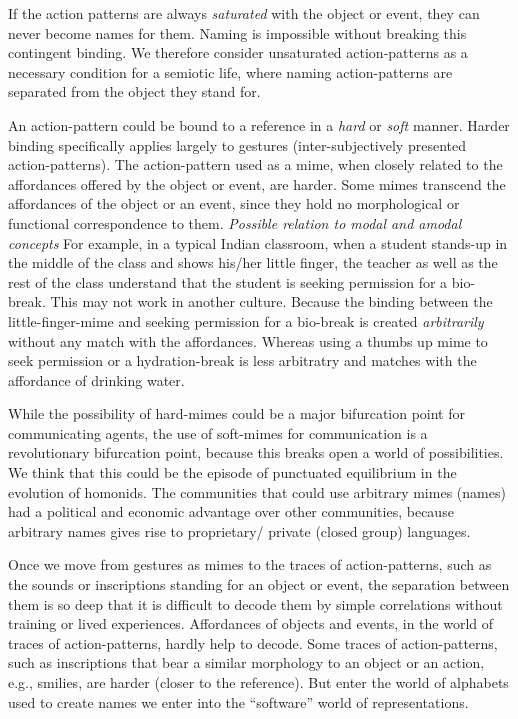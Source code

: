 {{{{{If the action patterns are always \textit{saturated} with the object or event, they can never become names for them. Naming is impossible without breaking this contingent binding. We therefore consider unsaturated action-patterns as a necessary condition for a semiotic life, where naming action-patterns are separated from the object they stand for. 

An action-pattern could be bound to a reference in a \textit{hard} or \textit{soft} manner. Harder binding specifically applies largely to gestures (inter-subjectively presented action-patterns). 
The action-pattern used as a mime, when closely related to the affordances offered by the object or event, are harder. 
Some mimes transcend the affordances of the object or an event, since they hold no morphological or functional correspondence to them. \emph{Possible relation to modal and amodal concepts} For example, in a typical Indian classroom, when a student stands-up in the middle of the class and shows his/her little finger, the teacher as well as the rest of the class understand that the student is seeking permission for a bio-break. This may not work in another culture. Because the binding between the little-finger-mime and seeking permission for a bio-break is created \textit{arbitrarily} without any match with the affordances. Whereas using a thumbs up mime to seek permission or a hydration-break is less arbitratry and matches with the affordance of drinking water. 

While the possibility of hard-mimes could be a major bifurcation point for communicating agents, the use of soft-mimes for communication is a revolutionary bifurcation point, because this breaks open a world of possibilities. 
We think that this could be the episode of punctuated equilibrium\cite{gould1977punctuated} in the evolution of homonids. The communities that could use arbitrary mimes (names) had a political and economic advantage over other communities, because arbitrary names gives rise to proprietary/ private (closed group) languages.\cite{corballis2014recursive}

Once we move from gestures as mimes to the traces of action-patterns, such as the sounds or inscriptions standing for an object or event, the separation between them is so deep that it is difficult to decode them by simple correlations without training or lived experiences. 
Affordances of objects and events, in the world of traces of action-patterns, hardly help to decode. Some traces of action-patterns, such as inscriptions that bear a similar morphology to an object or an action, e.g., smilies, are harder (closer to the reference). But enter the world of alphabets used to create names we enter into the ``software'' world of representations. 

}}}}}
